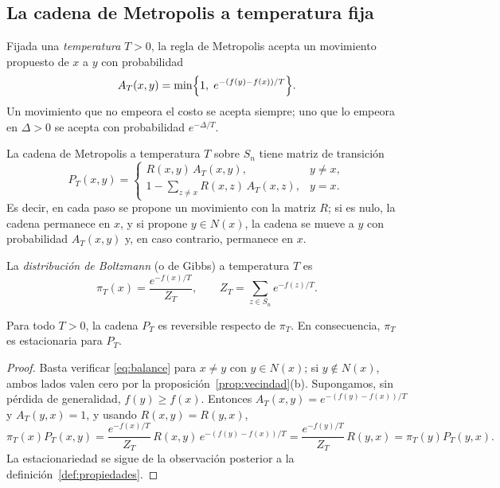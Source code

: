 \subsection{La cadena de Metropolis a temperatura fija}
\label{subsec:metropolis}

Fijada una \emph{temperatura} \(T>0\), la regla de Metropolis
\citep{metropolis1953,hastings1970} acepta un movimiento propuesto de
\(x\) a \(y\) con probabilidad
\begin{equation}
\label{eq:aceptacion}
A_T(x,y)=\min\Bigl\{1,\;e^{-(f(y)-f(x))/T}\Bigr\}.
\end{equation}
Un movimiento que no empeora el costo se acepta siempre; uno que lo
empeora en \(\Delta>0\) se acepta con probabilidad \(e^{-\Delta/T}\).

\begin{definicion}
\label{def:metropolis}
La cadena de Metropolis a temperatura \(T\) sobre \(S_n\) tiene matriz
de transición
\begin{equation}
\label{eq:metropolis}
P_T(x,y)=
\begin{cases}
R(x,y)\,A_T(x,y), & y\ne x,\\[0.5ex]
1-\displaystyle\sum_{z\ne x}R(x,z)\,A_T(x,z), & y=x.
\end{cases}
\end{equation}
Es decir, en cada paso se propone un movimiento con la matriz \(R\); si
es nulo, la cadena permanece en \(x\), y si propone \(y\in N(x)\), la
cadena se mueve a \(y\) con probabilidad \(A_T(x,y)\) y, en caso
contrario, permanece en \(x\).
\end{definicion}

\begin{definicion}
\label{def:boltzmann}
La \emph{distribución de Boltzmann} (o de Gibbs) a temperatura \(T\) es
\begin{equation}
\label{eq:boltzmann}
\pi_T(x)=\frac{e^{-f(x)/T}}{Z_T},
\qquad
Z_T=\sum_{z\in S_n}e^{-f(z)/T}.
\end{equation}
\end{definicion}

\begin{proposicion}
\label{prop:balance}
Para todo \(T>0\), la cadena \(P_T\) es reversible respecto de
\(\pi_T\). En consecuencia, \(\pi_T\) es estacionaria para \(P_T\).
\end{proposicion}

\begin{proof}
Basta verificar \eqref{eq:balance} para \(x\ne y\) con
\(y\in N(x)\); si \(y\notin N(x)\), ambos lados valen cero por la
proposición~\ref{prop:vecindad}(b). Supongamos, sin pérdida de
generalidad, \(f(y)\ge f(x)\). Entonces \(A_T(x,y)=e^{-(f(y)-f(x))/T}\)
y \(A_T(y,x)=1\), y usando \(R(x,y)=R(y,x)\),
\[
\pi_T(x)P_T(x,y)
=\frac{e^{-f(x)/T}}{Z_T}\,R(x,y)\,e^{-(f(y)-f(x))/T}
=\frac{e^{-f(y)/T}}{Z_T}\,R(y,x)
=\pi_T(y)P_T(y,x).
\]
La estacionariedad se sigue de la observación posterior a la
definición~\ref{def:propiedades}.
\end{proof}


